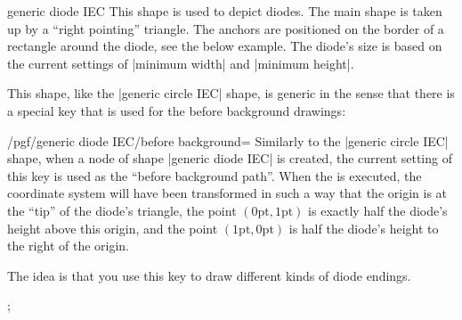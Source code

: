 \begin{shape}{generic diode IEC}
    This shape is used to depict diodes. The main shape is taken up by a
    ``right pointing'' triangle. The anchors are positioned on the border of a
    rectangle around the diode, see the below example. The diode's size is
    based on the current settings of |minimum width| and |minimum height|.
\begin{codeexample}[preamble={\usetikzlibrary{circuits.ee.IEC}}]
\end{codeexample}

    This shape, like the |generic circle IEC| shape, is generic in the sense
    that there is a special key that is used for the before background
    drawings:
    \begin{key}{/pgf/generic diode IEC/before background=}
        Similarly to the |generic circle IEC| shape, when a node of shape
        |generic diode IEC| is created, the current setting of this key is used
        as the ``before background path''. When the  is executed,
        the coordinate system will have been transformed in such a way that the
        origin is at the ``tip'' of the diode's triangle, the point
        $(0\mathrm{pt},1\mathrm{pt})$ is exactly half the diode's height above
        this origin, and the point $(1\mathrm{pt},0\mathrm{pt})$ is half the
        diode's height to the right of the origin.

        The idea is that you use this key to draw different kinds of diode
        endings.
\begin{codeexample}[preamble={\usetikzlibrary{circuits.ee.IEC}}]
\tikz \node [minimum size=1cm,generic diode IEC,
             /pgf/generic diode IEC/before background={
               \pgfpathmoveto{\pgfqpoint{-.5pt}{-1pt}}
               \pgfpathlineto{\pgfqpoint{.5pt}{-1pt}}
               \pgfpathmoveto{\pgfqpoint{0pt}{-1pt}}
               \pgfpathlineto{\pgfqpoint{0pt}{1pt}}
               \pgfpathmoveto{\pgfqpoint{-.5pt}{1pt}}
               \pgfpathlineto{\pgfqpoint{.5pt}{1pt}}
               \pgfusepathqstroke
             },
             draw] {};
\end{codeexample}
    \end{key}
\end{shape}

